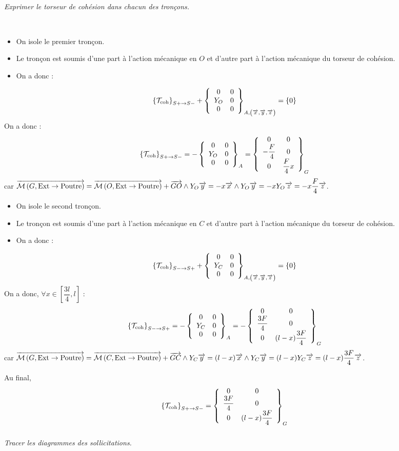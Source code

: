 \documentclass[10pt,fleqn]{article} %
\begin{document}
\begin{multicols}{2}
\subparagraph{}
\textit{Exprimer le torseur de cohésion dans chacun des tronçons.}
\ifprof
\begin{corrige}~\\
\begin{itemize}[label=,font=\color{ocre}] 
\item On isole le premier tronçon.
\item Le tronçon est soumis d'une part à l'action mécanique en $O$ et d'autre part à l'action mécanique du torseur de cohésion.
\item On a donc :
\end{itemize}
$$
\torseurscoh_{S+\rightarrow S-} + \torseurcol{0}{Y_O}{0}{0}{0}{0}{A,\left( \vect{x},\vect{y},\vect{z} \right)} = \{0\}
$$
On a donc :
$$\torseurscoh_{S+\rightarrow S-}
=-\torseurcol{0}{Y_O}{0}{0}{0}{0}{A}
=\torseurcol{0}{-\dfrac{F}{4}}{0}{0}{0}{ \dfrac{F}{4}x}{G}
$$
car $\vectm{G}{\text{Ext}}{\text{Poutre}}=\vectm{O}{\text{Ext}}{\text{Poutre}} + \vect{GO}\wedge Y_O \vect{y}  = -x\vect{x} \wedge Y_O \vect{y} = -x Y_O \vect{z}= -x \dfrac{F}{4} \vect{z}$.

\begin{itemize}[label=,font=\color{ocre}] 
\item On isole le second tronçon.
\item Le tronçon est soumis d'une part à l'action mécanique en $C$ et d'autre part à l'action mécanique du torseur de cohésion.
\item On a donc :
\end{itemize}
$$
\torseurscoh_{S-\rightarrow S+} + \torseurcol{0}{Y_C}{0}{0}{0}{0}{A,\left( \vect{x},\vect{y},\vect{z} \right)} = \{0\}
$$
On a donc, $\forall x \in\left[\dfrac{3l}{4},l\right]$ :
$$
\torseurscoh_{S-\rightarrow S+}
=-\torseurcol{0}{Y_C}{0}{0}{0}{0}{A}
=-\torseurcol{0}{\dfrac{3F}{4}}{0}{0}{0}{ (l-x) \dfrac{3F}{4}}{G}
$$
car $\vectm{G}{\text{Ext}}{\text{Poutre}}=\vectm{C}{\text{Ext}}{\text{Poutre}} + \vect{GC}\wedge Y_C \vect{y}  = (l-x)\vect{x} \wedge Y_C \vect{y} = (l-x) Y_C \vect{z}= (l-x) \dfrac{3F}{4} \vect{z}$.

Au final,
$$\torseurscoh_{S+\rightarrow S-}
=\torseurcol{0}{\dfrac{3F}{4}}{0}{0}{0}{ (l-x) \dfrac{3F}{4}}{G}
$$
\end{corrige}
\else 
\fi

\subparagraph{}
\textit{Tracer les diagrammes des sollicitations.}
\ifprof
\begin{corrige}~\\


\end{corrige}
\end{multicols}
\end{document}
